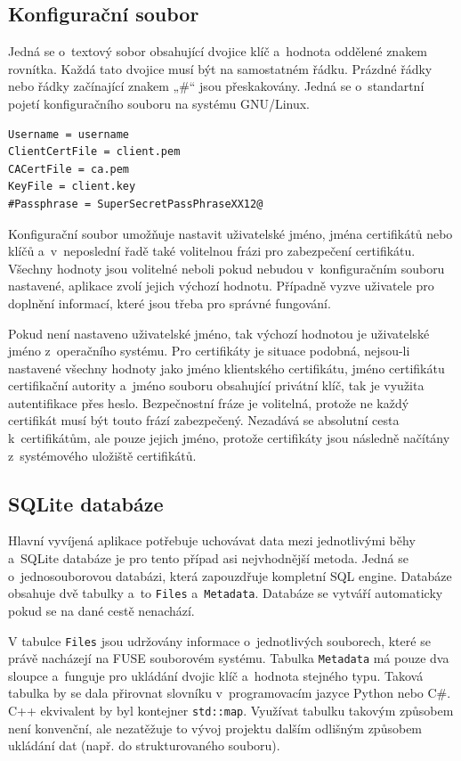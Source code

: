 \subsection{Konfigurační soubor}
\label{subsec:config}

Jedná se o textový sobor obsahující dvojice klíč a hodnota oddělené znakem rovnítka. Každá tato dvojice musí být na samostatném řádku. Prázdné řádky nebo řádky
začínající znakem „\#“ jsou přeskakovány. Jedná se o standartní pojetí konfiguračního souboru na systému GNU/Linux.

\begin{lstlisting}[caption={Příklad obsahu konfiguračního souboru.}]
Username = username
ClientCertFile = client.pem
CACertFile = ca.pem
KeyFile = client.key
#Passphrase = SuperSecretPassPhraseXX12@
\end{lstlisting}

Konfigurační soubor umožňuje nastavit uživatelské jméno, jména certifikátů nebo klíčů a v neposlední řadě také volitelnou frázi pro zabezpečení certifikátu.
Všechny hodnoty jsou volitelné neboli pokud nebudou v konfiguračním souboru nastavené, aplikace zvolí jejich výchozí hodnotu. Případně vyzve uživatele pro doplnění
informací, které jsou třeba pro správné fungování.

Pokud není nastaveno uživatelské jméno, tak výchozí hodnotou je uživatelské jméno z operačního systému. Pro certifikáty je situace podobná, nejsou-li nastavené
všechny hodnoty jako jméno klientského certifikátu, jméno certifikátu certifikační autority a jméno souboru obsahující privátní klíč, tak je využita autentifikace přes
heslo. Bezpečnostní fráze je volitelná, protože ne každý certifikát musí být touto frází zabezpečený. Nezadává se absolutní cesta k certifikátům, ale pouze jejich jméno,
protože certifikáty jsou následně načítány z systémového uložiště certifikátů.

\subsection{SQLite databáze}

Hlavní vyvíjená aplikace potřebuje uchovávat data mezi jednotlivými běhy a SQLite databáze je pro tento případ asi nejvhodnější metoda. Jedná se o jednosouborovou databázi,
která zapouzdřuje kompletní SQL engine. Databáze obsahuje dvě tabulky a to \texttt{Files} a \texttt{Metadata}. Databáze se vytváří automaticky pokud se na dané cestě nenachází.

V tabulce \texttt{Files} jsou udržovány informace o jednotlivých souborech, které se právě nacházejí na FUSE souborovém systému. Tabulka \texttt{Metadata} má pouze dva
sloupce a funguje pro ukládání dvojic klíč a hodnota stejného typu. Taková tabulka by se dala přirovnat slovníku v programovacím jazyce Python nebo C\#. C++ ekvivalent by
byl kontejner \texttt{std::map}. Využívat tabulku takovým způsobem není konvenční, ale nezatěžuje to vývoj projektu dalším odlišným způsobem ukládání dat 
(např. do strukturovaného souboru).

